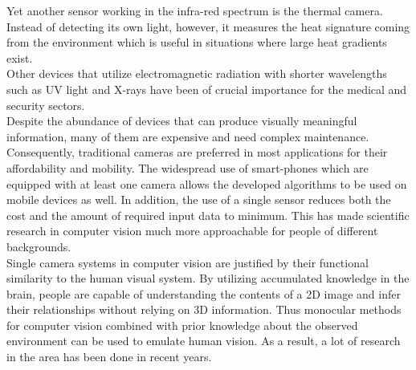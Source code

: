 \documentclass[main.tex]{subfiles}
\begin{document}
\indent Yet another sensor working in the infra-red spectrum is the thermal camera. Instead of detecting its own light, however, it measures the heat signature coming from the environment which is useful in situations where large heat gradients exist.\\
\indent Other devices that utilize electromagnetic radiation with shorter wavelengths such as UV light and X-rays have been of crucial importance for the medical and security sectors. \\
\indent Despite the abundance of devices that can produce visually meaningful information, many of them are expensive and need complex maintenance. Consequently, traditional cameras are preferred in most applications for their affordability and mobility. The widespread use of smart-phones which are equipped with at least one camera allows the developed algorithms to be used on mobile devices as well. In addition, the use of a single sensor reduces both the cost and the amount of required input data to minimum. This has made scientific research in computer vision much more approachable for people of different backgrounds. \\
\indent Single camera systems in computer vision are justified by their functional similarity to the human visual system. By utilizing accumulated knowledge in the brain, people are capable of understanding the contents of a 2D image and infer their relationships without relying on 3D information. Thus monocular methods for computer vision combined with prior knowledge about the observed environment can be used to emulate human vision. As a result, a lot of research in the area has been done in recent years.
\end{document}
